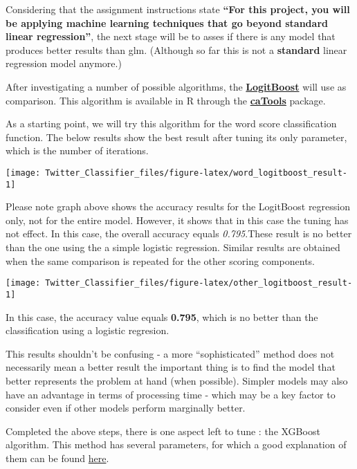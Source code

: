 \documentclass[11pt,]{article}
\begin{document}
Considering that the assignment instructions state \textbf{``For this
project, you will be applying machine learning techniques that go beyond
standard linear regression''}, the next stage will be to asses if there
is any model that produces better results than glm. (Although so far
this is not a \textbf{standard} linear regression model anymore.)

After investigating a number of possible algorithms, the
\href{https://en.wikipedia.org/wiki/LogitBoost}{\textbf{LogitBoost}}
will use as comparison. This algorithm is available in R through the
\href{https://www.rdocumentation.org/packages/caTools/versions/1.17.1/topics/LogitBoost}{\textbf{caTools}}
package.

As a starting point, we will try this algorithm for the word score
classification function. The below results show the best result after
tuning its only parameter, which is the number of iterations.

\begin{center}\texttt{[image: Twitter\_Classifier\_files/figure-latex/word\_logitboost\_result-1]} \end{center}

Please note graph above shows the accuracy results for the LogitBoost
regression only, not for the entire model. However, it shows that in
this case the tuning has not effect. In this case, the overall accuracy
equals \emph{0.795}.These result is no better than the one using the a
simple logistic regression. Similar results are obtained when the same
comparison is repeated for the other scoring components.

\begin{center}\texttt{[image: Twitter\_Classifier\_files/figure-latex/other\_logitboost\_result-1]} \end{center}

In this case, the accuracy value equals \textbf{0.795}, which is no
better than the classification using a logistic regresion.

This results shouldn't be confusing - a more ``sophisticated'' method
does not necessarily mean a better result the important thing is to find
the model that better represents the problem at hand (when possible).
Simpler models may also have an advantage in terms of processing time -
which may be a key factor to consider even if other models perform
marginally better.

Completed the above steps, there is one aspect left to tune : the
XGBoost algorithm. This method has several parameters, for which a good
explanation of them can be found
\href{https://www.hackerearth.com/practice/machine-learning/machine-learning-algorithms/beginners-tutorial-on-xgboost-parameter-tuning-r/tutorial/}{here}.
\end{document}
